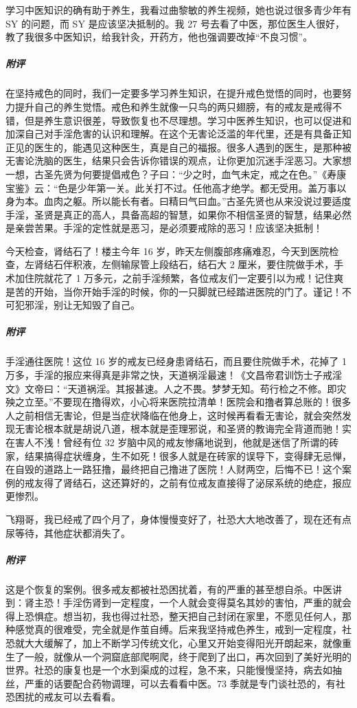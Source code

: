 \begin{case}
    学习中医知识的确有助于养生，我看过曲黎敏的养生视频，她也说过很多青少年有 SY 的问题，而 SY 是应该坚决抵制的。我 27 号去看了中医，那位医生人很好，教了我很多中医知识，给我针灸，开药方，他也强调要改掉“不良习惯”。
    \subparagraph{附评} 在坚持戒色的同时，我们一定要多学习养生知识，在提升戒色觉悟的同时，也要努力提升自己的养生觉悟。戒色和养生就像一只鸟的两只翅膀，有的戒友是戒得不错，但是养生意识很差，导致恢复也不尽理想。学习中医养生知识，也可以促进和加深自己对手淫危害的认识和理解。在这个无害论泛滥的年代里，还是有具备正知正见的医生的，能遇见这种医生，真是自己的福报。很多人遇到的医生，是那种被无害论洗脑的医生，结果只会告诉你错误的观点，让你更加沉迷手淫恶习。大家想一想，古圣先贤为何要提倡戒色？子曰：“少之时，血气未定，戒之在色。”《寿康宝鉴》云：“色是少年第一关。此关打不过。任他高才绝学。都无受用。盖万事以身为本。血肉之躯。所以能长有者。曰精曰气曰血。”古圣先贤也从来没说过要适度手淫，圣贤是真正的高人，具备高超的智慧，如果你不相信圣贤的智慧，结果必然是亲尝苦果。手淫的定性就是恶习，是必须要戒除的恶习！应该坚决抵制！
\end{case}

\begin{case}
    今天检查，肾结石了！楼主今年 16 岁，昨天左侧腹部疼痛难忍，今天到医院检查，左肾结石伴积液，左侧输尿管上段结石，结石大 2 厘米，要住院做手术，手术加住院就花了 1 万多元，之前手淫频繁，各位戒友们一定要引以为戒！记住爽是苦的开始，当你开始手淫的时候，你的一只脚就已经踏进医院的门了。谨记！不可犯邪淫，别让无知毁了自己。
    \subparagraph{附评} 手淫通往医院！这位 16 岁的戒友已经身患肾结石，而且要住院做手术，花掉了 1 万多，手淫的报应来得真是非常之快，天道祸淫最速！《文昌帝君训饬士子戒淫文》文帝曰：“天道祸淫。其报甚速。人之不畏。梦梦无知。苟行检之不修。即灾殃之立至。”不要现在撸得欢，小心将来医院拉清单！医院会和撸者算总账的！很多人之前相信无害论，但是当症状降临在他身上，这时候再看看无害论，就会突然发现无害论根本就是胡说八道，根本就是歪理邪说，和圣贤的教诲完全背道而驰！实在害人不浅！曾经有位 32 岁脑中风的戒友惨痛地说到，他就是迷信了所谓的砖家，结果搞得症状缠身，生不如死！很多人就是在砖家的误导下，变得肆无忌惮，在自毁的道路上一路狂撸，最终把自己撸进了医院！人财两空，后悔不已！这个案例的戒友得了肾结石，这还算好的，之前有位戒友直接得了泌尿系统的绝症，报应更惨烈。
\end{case}

\begin{case}
    飞翔哥，我已经戒了四个月了，身体慢慢变好了，社恐大大地改善了，现在还有点尿等待，其他症状都消失了。
    \subparagraph{附评} 这是个恢复的案例。很多戒友都被社恐困扰着，有的严重的甚至想自杀。中医讲到：肾主恐！手淫伤肾到一定程度，一个人就会变得莫名其妙的害怕，严重的就会得上恐惧症。想当初，我也得过社恐，整天把自己封闭在家里，不愿见任何人，那种感觉真的很难受，完全就是作茧自缚。后来我坚持戒色养生，戒到一定程度，社恐就大大缓解了，加上不断学习传统文化，心里又开始变得阳光开朗起来，就像重生了一般，就像从一个洞窟底部爬啊爬，终于爬到了出口，再次回到了美好光明的世界。社恐的康复也是一个水到渠成的过程，急不来，只能慢慢坚持，病去如抽丝，严重的话要配合药物调理，可以去看看中医。73 季就是专门谈社恐的，有社恐困扰的戒友可以去看看。
\end{case}

